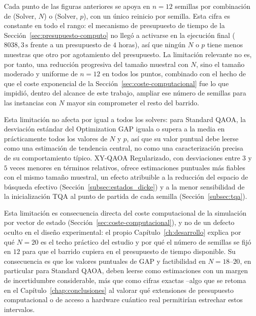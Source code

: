 Cada punto de las figuras anteriores se apoya en $n=12$ semillas por combinación de (Solver, $N$) o (Solver, $p$), con un único reinicio por semilla. Esta cifra es constante en todo el rango: el mecanismo de presupuesto de tiempo de la Sección~\ref{sec:presupuesto-computo} no llegó a activarse en la ejecución final ($8038{,}3\,\text{s}$ frente a un presupuesto de $4$ horas), así que ningún $N$ o $p$ tiene menos muestras que otro por agotamiento del presupuesto. La limitación relevante no es, por tanto, una reducción progresiva del tamaño muestral con $N$, sino el tamaño moderado y uniforme de $n=12$ en todos los puntos, combinado con el hecho de que el coste exponencial de la Sección~\ref{sec:coste-computacional} fue lo que impidió, dentro del alcance de este trabajo, ampliar ese número de semillas para las instancias con $N$ mayor sin comprometer el resto del barrido.

Esta limitación no afecta por igual a todos los solvers: para Standard QAOA, la desviación estándar del Optimization GAP iguala o supera a la media en prácticamente todos los valores de $N$ y $p$, así que su valor puntual debe leerse como una estimación de tendencia central, no como una caracterización precisa de su comportamiento típico. XY-QAOA Regularizado, con desviaciones entre $3$ y $5$ veces menores en términos relativos, ofrece estimaciones puntuales más fiables con el mismo tamaño muestral, un efecto atribuible a la reducción del espacio de búsqueda efectivo (Sección~\ref{subsec:estados_dicke}) y a la menor sensibilidad de la inicialización TQA al punto de partida de cada semilla (Sección~\ref{subsec:tqa}).

Esta limitación es consecuencia directa del coste computacional de la simulación por vector de estado (Sección~\ref{sec:coste-computacional}), y no de un defecto oculto en el diseño experimental: el propio Capítulo~\ref{ch:desarrollo} explica por qué $N=20$ es el techo práctico del estudio y por qué el número de semillas se fijó en $12$ para que el barrido cupiera en el presupuesto de tiempo disponible. Su consecuencia es que los valores puntuales de GAP y factibilidad en $N=18$--$20$, en particular para Standard QAOA, deben leerse como estimaciones con un margen de incertidumbre considerable, más que como cifras exactas --algo que se retoma en el Capítulo~\ref{chap:conclusiones} al valorar qué extensiones de presupuesto computacional o de acceso a hardware cuántico real permitirían estrechar estos intervalos.